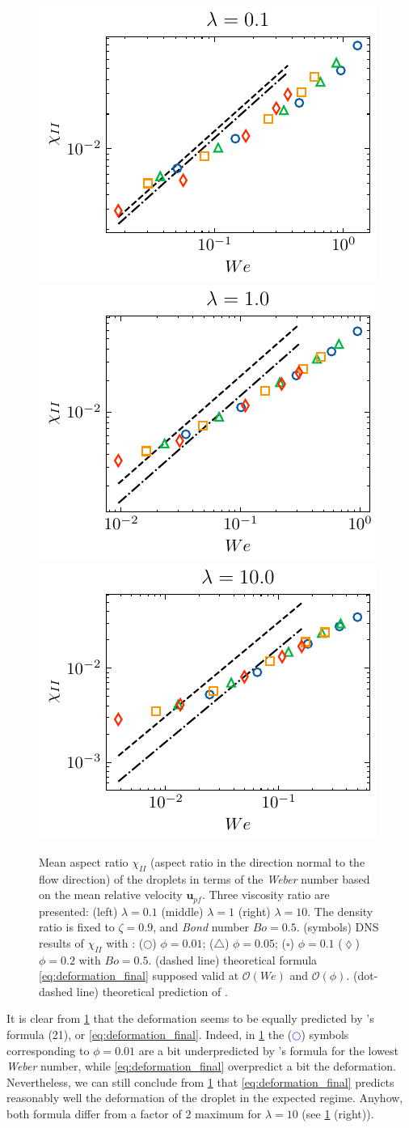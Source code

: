 \begin{figure}[h!]
    \centering
    \includegraphics[height = 0.25\textwidth]{image/HOMOGENEOUS_final/PA/chi2_l_1.pdf}
    \includegraphics[height = 0.25\textwidth]{image/HOMOGENEOUS_final/PA/chi2_l_10.pdf}
    \includegraphics[height = 0.25\textwidth]{image/HOMOGENEOUS_final/PA/chi2_l_100.pdf}
    \caption{
        Mean aspect ratio $\chi_{II}$ (aspect ratio in the direction normal to the flow direction) of the droplets in terms of the \textit{Weber} number based on the mean relative velocity $\textbf{u}_{pf}$. 
        Three viscosity ratio are presented: (left) $\lambda = 0.1$ (middle) $\lambda = 1$ (right) $\lambda = 10$. 
        The density ratio is fixed to $\zeta = 0.9$, and \textit{Bond} number $Bo =0.5$. 
        (symbols) DNS results of $\chi_{II}$ with :
        ($\pmb\bigcirc$) $\phi = 0.01$; ($\pmb\triangle$) $ \phi = 0.05$; ($\pmb\square$) $\phi = 0.1$ ($\pmb\lozenge$) $\phi = 0.2$ with $Bo = 0.5$.
        (dashed line) theoretical formula \ref{eq:deformation_final} supposed valid at $\mathcal{O}(We)$ and $\mathcal{O}(\phi)$. 
        (dot-dashed line) theoretical prediction of \citet{taylor1964deformation}. 
     }
     \label{fig:compare_def_with_DNS}
\end{figure}
It is clear from \ref{fig:compare_def_with_DNS} that the deformation seems to be equally predicted by \citet{taylor1964deformation}'s formula (21), or \ref{eq:deformation_final}. 
Indeed, in \ref{fig:compare_def_with_DNS} the (\textcolor{blue}{$\pmb\bigcirc$}) symbols corresponding to $\phi = 0.01$ are a bit underpredicted by \citet{taylor1964deformation}'s formula for the lowest \textit{Weber} number, while \ref{eq:deformation_final} overpredict a bit the deformation. 
Nevertheless, we can still conclude from \ref{fig:compare_def_with_DNS} that \ref{eq:deformation_final} predicts reasonably well the deformation of the droplet in the expected regime.
Anyhow, both formula differ from a factor of $2$ maximum for $\lambda = 10$ (see \ref{fig:compare_def_with_DNS} (right)). 

